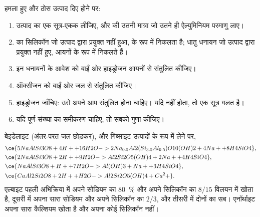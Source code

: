 \begin{method}[जल-अपघटन अभिक्रिया का संतुलन]
\label{met:b1:weathering-clays:balance}
हमला हुए  और ठोस उत्पाद दिए होने पर:
\begin{enumerate}
  \item उत्पाद का एक सूत्र-एकक लीजिए, और  की उतनी मात्रा जो उतने ही ऐल्युमिनियम परमाणु लाए।
  \item {} का सिलिकॉन जो उत्पाद द्वारा प्रयुक्त नहीं हुआ,  के रूप में निकलता है; धातु धनायन जो उत्पाद द्वारा प्रयुक्त नहीं हुए, आयनों के रूप में निकलते हैं।
  \item इन धनायनों के आवेश को बाईं ओर हाइड्रोजन आयनों से संतुलित कीजिए।
  \item ऑक्सीजन को बाईं ओर जल से संतुलित कीजिए।
  \item हाइड्रोजन जाँचिए: उसे अपने आप संतुलित होना चाहिए। यदि नहीं होता, तो एक सूत्र गलत है।
  \item यदि पूर्ण-संख्या का समीकरण चाहिए, तो सबको गुणा कीजिए।
\end{enumerate}
\end{method}

\begin{proposition}[फ़ेल्डस्पारों का जल-अपघटन]\label{prop:b1:weathering-clays:feldspars}
 बेइडेलाइट  (अंतर-परत जल छोड़कर),   और गिब्साइट  उत्पादों के रूप में लेने पर,
\begin{align*}
&\ce{5 NaAlSi3O8 + 4 H+ + 16 H2O -> 2 Na_{0.5}Al2(Si_{3.5}Al_{0.5})O10(OH)2 + 4 Na+ + 8 H4SiO4},\\ %
&\ce{2 NaAlSi3O8 + 2 H+ + 9 H2O -> Al2Si2O5(OH)4 + 2 Na+ + 4 H4SiO4},\\
&\ce{NaAlSi3O8 + H+ + 7 H2O -> Al(OH)3 + Na+ + 3 H4SiO4},\\
&\ce{CaAl2Si2O8 + 2 H+ + H2O -> Al2Si2O5(OH)4 + Ca^2+}.
\end{align*}
एल्बाइट पहली अभिक्रिया में अपने सोडियम का \qty{80}{\percent} और अपने सिलिकॉन का $8/15$ विलयन में खोता है, दूसरी में अपना सारा सोडियम और अपने सिलिकॉन का $2/3$, और तीसरी में दोनों का सब। एनॉर्थाइट अपना सारा कैल्शियम खोता है और अपना कोई सिलिकॉन नहीं।
\end{proposition}

